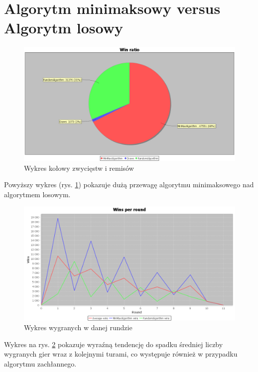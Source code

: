 \clearpage
\section{Algorytm minimaksowy versus Algorytm losowy}

\begin{figure}[H]
	\centering
	\includegraphics[width=\textwidth]{Resources/MmVsR/MmVsRwin.PNG}
	\caption{Wykres kołowy zwycięstw i remisów} 
	\label{fig:MmVsRwin}
\end{figure}

Powyższy wykres (rys. \ref{fig:MmVsRwin}) pokazuje dużą przewagę algorytmu minimaksowego nad algorytmem losowym.

\begin{figure}[H]
	\centering
	\includegraphics[width=\textwidth]{Resources/MmVsR/MmVsRroundwin.PNG}
	\caption{Wykres wygranych w danej rundzie} 
	\label{fig:MmVsRroundwin}
\end{figure}

Wykres na rys. \ref{fig:MmVsRroundwin} pokazuje wyraźną tendencję do spadku średniej liczby wygranych gier wraz z kolejnymi turami, co występuje również w przypadku algorytmu zachłannego.


